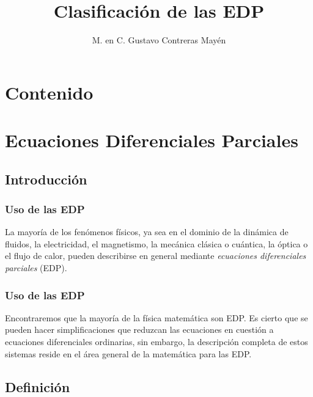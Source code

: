 \documentclass[12pt]{beamer}
\date{}
\title{Clasificación de las EDP}
\author{M. en C. Gustavo Contreras Mayén}
\begin{document}
\maketitle
\fontsize{14}{14}\selectfont
{}

\section*{Contenido}

\section{Ecuaciones Diferenciales Parciales}
\subsection{Introducción}

\begin{frame}
\frametitle{Uso de las EDP}
La mayoría de los fenómenos físicos, ya sea en el dominio de la dinámica de fluidos, la electricidad, el magnetismo, la mecánica clásica o cuántica, la óptica o el flujo de calor, pueden describirse en general mediante \emph{ecuaciones diferenciales parciales} (EDP).
\end{frame}
\begin{frame}
\frametitle{Uso de las EDP}
Encontraremos que la mayoría de la física matemática son EDP. Es cierto que se pueden hacer simplificaciones que reduzcan las ecuaciones en cuestión a ecuaciones diferenciales ordinarias, sin embargo, la descripción completa de estos sistemas reside en el área general de la matemática para las EDP.
\end{frame}

\subsection{Definición}
\end{document}
